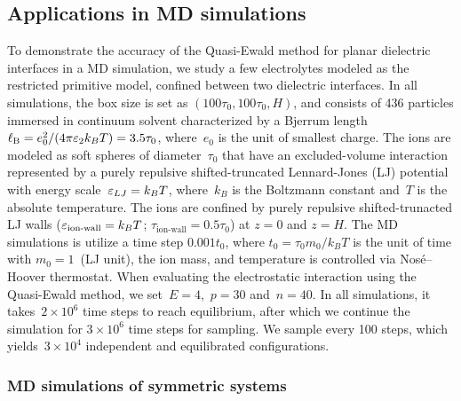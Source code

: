 \subsection{Applications in MD simulations}

To demonstrate the accuracy of the Quasi-Ewald method for planar dielectric interfaces in a MD simulation, we study a few electrolytes modeled as the restricted primitive model, confined between two dielectric interfaces.
In all simulations, the box size is set as $(100 \tau_0, 100\tau_0, H)$, and consists of 436 particles immersed in continuum solvent characterized by a Bjerrum length $\ell_{\mathrm B} = e_0^2/(4 \pi \varepsilon_2 k_B T) = 3.5 \tau_0$, where~$e_0$ is the unit of smallest charge.
The ions are modeled as soft spheres of diameter~$\tau_0$ that have an excluded-volume interaction represented by a purely repulsive shifted-truncated Lennard-Jones (LJ) potential with energy scale~$\varepsilon_{LJ} = k_B T$, where~$k_B$ is the Boltzmann constant and~$T$ is the absolute temperature.
The ions are confined by purely repulsive shifted-trunacted LJ walls ($\varepsilon_\text{ion-wall} = k_B T$; $\tau_\text{ion-wall} = 0.5 \tau_0$) at $z = 0$ and $z = H$. 
The MD simulations is utilize a time step $0.001 t_0$, where $t_0 = \tau_0 m_0 / k_B T$ is the unit of time with $m_0 = 1$~(LJ unit), the ion mass, and temperature is controlled via Nosé–Hoover thermostat.
When evaluating the electrostatic interaction using the Quasi-Ewald method, we set~$E = 4$,~$p = 30$ and~$n = 40$.
In all simulations, it takes~$2 \times 10^6$ time steps to reach equilibrium, after which we continue the simulation for $3 \times 10^6$ time steps for sampling.
We sample every 100 steps, which yields~$3 \times 10^{4}$ independent and equilibrated configurations.

\subsubsection{MD simulations of symmetric systems}


